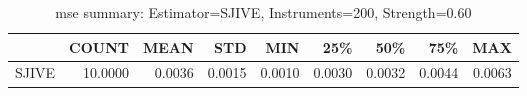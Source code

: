 \begin{table}[ht]
\centering
\caption{mse summary: Estimator=SJIVE, Instruments=200, Strength=0.60}
\begin{tabular}{lrrrrrrrr}
\toprule
 & COUNT & MEAN & STD & MIN & 25\% & 50\% & 75\% & MAX \\
\midrule
SJIVE & 10.0000 & 0.0036 & 0.0015 & 0.0010 & 0.0030 & 0.0032 & 0.0044 & 0.0063 \\
\bottomrule
\end{tabular}
\end{table}
